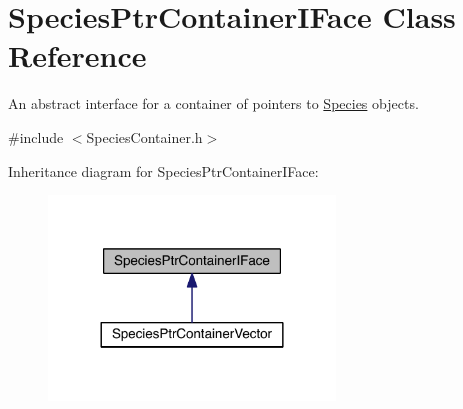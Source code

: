 \hypertarget{classSpeciesPtrContainerIFace}{\section{Species\+Ptr\+Container\+I\+Face Class Reference}
\label{classSpeciesPtrContainerIFace}
}


An abstract interface for a container of pointers to \hyperlink{classSpecies}{Species} objects.  




{\ttfamily \#include $<$Species\+Container.\+h$>$}



Inheritance diagram for Species\+Ptr\+Container\+I\+Face\+:\nopagebreak
\begin{figure}[H]
\begin{center}
\leavevmode
\includegraphics[width=216pt]{classSpeciesPtrContainerIFace__inherit__graph}
\end{center}
\end{figure}
